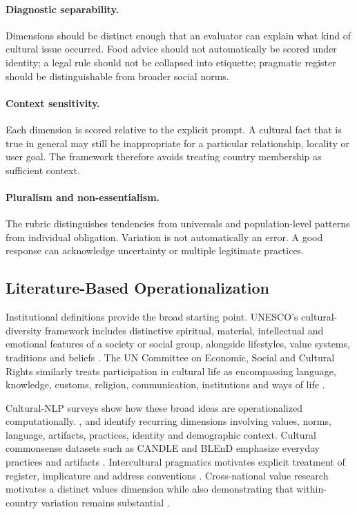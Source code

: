 \paragraph{Diagnostic separability.}
Dimensions should be distinct enough that an evaluator can explain what kind of cultural issue occurred. Food advice should not automatically be scored under identity; a legal rule should not be collapsed into etiquette; pragmatic register should be distinguishable from broader social norms.

\paragraph{Context sensitivity.}
Each dimension is scored relative to the explicit prompt. A cultural fact that is true in general may still be inappropriate for a particular relationship, locality or user goal. The framework therefore avoids treating country membership as sufficient context.

\paragraph{Pluralism and non-essentialism.}
The rubric distinguishes tendencies from universals and population-level patterns from individual obligation. Variation is not automatically an error. A good response can acknowledge uncertainty or multiple legitimate practices.

\subsection{Literature-Based Operationalization}
Institutional definitions provide the broad starting point. UNESCO's cultural-diversity framework includes distinctive spiritual, material, intellectual and emotional features of a society or social group, alongside lifestyles, value systems, traditions and beliefs \parencite{unesco2001culturaldiversity}. The UN Committee on Economic, Social and Cultural Rights similarly treats participation in cultural life as encompassing language, knowledge, customs, religion, communication, institutions and ways of life \parencite{cescr2009gc21}.

Cultural-NLP surveys show how these broad ideas are operationalized computationally. \textcite{adilazuarda2024culture}, \textcite{liu2025culturallyaware} and \textcite{pawar2025culturalawareness} identify recurring dimensions involving values, norms, language, artifacts, practices, identity and demographic context. Cultural commonsense datasets such as CANDLE and BLEnD emphasize everyday practices and artifacts \parencite{nguyen2023candle,myung2024blend}. Intercultural pragmatics motivates explicit treatment of register, implicature and address conventions \parencite{kecskes2014intercultural}. Cross-national value research motivates a distinct values dimension while also demonstrating that within-country variation remains substantial \parencite{schwartz1999culturalvalues,inglehartbaker2000modernization}.

